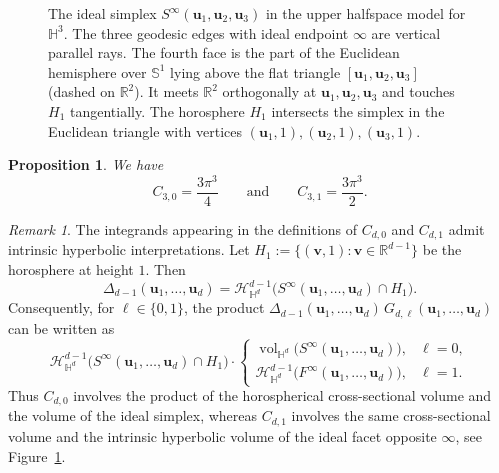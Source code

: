 \documentclass[11pt,a4paper]{article}
\theoremstyle{plain}
\newtheorem{proposition}[theorem]{Proposition}
\theoremstyle{definition}
\theoremstyle{remark}
\newtheorem{remark}[theorem]{Remark}
\newcommand{\vol}{\mathop{\mathrm{vol}}\nolimits}
\newcommand{\bu}{\boldsymbol{u}}
\newcommand{\bv}{\boldsymbol{v}}
\def\HH{\mathbb{H}}
\def\RR{\mathbb{R}}
\def\SS{\mathbb{S}}
\def\cH{\mathcal{H}}
\begin{document}
\begin{figure}[t]

	\caption{The ideal simplex
		$S^\infty(\bu_1,\bu_2,\bu_3)$ in the upper halfspace model for $\HH^3$.
		The three geodesic edges with ideal endpoint $\infty$ are vertical
		parallel rays. The fourth face is the part of the Euclidean hemisphere
		over $\SS^1$ lying above the flat triangle $[\bu_1,\bu_2,\bu_3]$
		(dashed on $\RR^2$). It meets $\RR^2$ orthogonally at
		$\bu_1,\bu_2,\bu_3$ and touches $H_1$ tangentially. The horosphere
		$H_1$ intersects the simplex in the
		Euclidean triangle with vertices
		$(\bu_1,1),(\bu_2,1),(\bu_3,1)$.
	}
	\label{fig:Sinfinity}
\end{figure}

\begin{proposition}\label{cor:Vold=2d=3}
	We have
	\[
		C_{3,0}=\frac{3\pi^3}{4}
		\qquad\text{and}\qquad
		C_{3,1}=\frac{3\pi^3}{2}.
	\]
\end{proposition}


\begin{remark}
	The integrands appearing in the definitions of $C_{d,0}$ and
	$C_{d,1}$ admit intrinsic hyperbolic interpretations. Let $H_1:=\{(\bv,1):\bv\in\RR^{d-1}\}$
	be the horosphere at height $1$. Then
	\[
		\Delta_{d-1}(\bu_1,\ldots,\bu_d)
		=
		\cH^{d-1}_{\HH^d}\bigl(
		S^\infty(\bu_1,\ldots,\bu_d)\cap H_1
		\bigr).
	\]
	Consequently, for $\ell\in\{0,1\}$, the product $\Delta_{d-1}(\bu_1,\ldots,\bu_d)\,G_{d,\ell}(\bu_1,\ldots,\bu_d)$
	can be written as
	\[
		\cH^{d-1}_{\HH^d}\bigl(
		S^\infty(\bu_1,\ldots,\bu_d)\cap H_1
		\bigr)
		\cdot
		\begin{cases}
			\vol_{\HH^d}\bigl(
			S^\infty(\bu_1,\ldots,\bu_d)
			\bigr), & \ell=0, \\[1mm]
			\cH_{\HH^d}^{d-1}\bigl(
			F^\infty(\bu_1,\ldots,\bu_d)
			\bigr), & \ell=1.
		\end{cases}
	\]
	Thus $C_{d,0}$ involves the product of the horospherical
	cross-sectional volume and the volume of the ideal simplex, whereas
	$C_{d,1}$ involves the same cross-sectional volume and the intrinsic
	hyperbolic volume of the ideal facet opposite $\infty$, see
	Figure~\ref{fig:Sinfinity}.
\end{remark}
\end{document}
